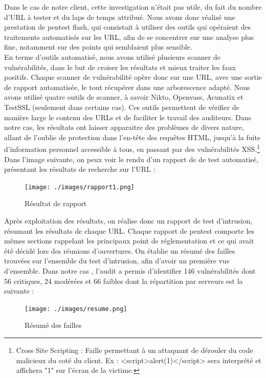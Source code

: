 \documentclass[a4paper]{memoir}
\begin{document}
Dans le cas de notre client, cette investigation n'était pas utile, du fait du nombre d'URL à tester et du laps de temps attribué. Nous avons donc réalisé une prestation de pentest flash, qui consistait à utiliser des outils qui opéraient des traitements automatisés sur les URL, afin de se concentrer sur une analyse plus fine, notamment sur des points qui semblaient plus sensible.\\
En terme d'outils automatisé, nous avons utilisé plusieurs scanner de vulnérabilités, dans le but de croiser les résultats et mieux traiter les faux positifs. Chaque scanner de vulnérabilité opère donc sur une URL, avec une sortie de rapport automatisée, le tout récupérer dans une arborescence adapté. Nous avons utilisé quatre outils de scanner, à savoir Nikto, Openvass, Acunatix et TestSSL (seulement dans certains cas). Ces outils permettent de vérifier de manière large le contenu des URLs et de faciliter le travail des auditeurs.
Dans notre cas, les résultats ont laisser apparaitre des problèmes de divers nature, allant de l'oublie de protection dans l'en-tête des requêtes HTML, jusqu'à la fuite d'information personnel accessible à tous, en passant par des vulnérabilités XSS.\footnote{Cross Site Scripting : Faille permettant à un attaquant de dérouler du code malicieux du coté du client. Ex : <script>alert(1)</script> sera interprété et affichera "1" sur l'écran de la victime.}
Dans l'image suivante, on peux voir le rendu d'un rapport de de test automatisé, présentant les résultats de recherche sur l'URL :

\begin{figure}[!ht]
    \center
    \texttt{[image: ./images/rapport1.png]}
    \caption{Résultat de rapport}
    \label{ID}
\end{figure}

Après exploitation des résultats, on réalise donc un rapport de test d'intrusion, résumant les résultats de chaque URL. Chaque rapport de pentest comporte les mêmes sections rappelant les principaux point de réglementation et ce qui avait été décidé lors des réunions d'ouvertures. 
On établie un résumé des failles trouvées sur l'ensemble du test d'intrusion, afin d'avoir un première vue d'ensemble. Dans notre cas , l’audit a permis d’identifier 146 vulnérabilités dont 56 critiques, 24 modérées et 66 faibles dont la répartition par serveurs est la suivante :

\begin{figure}[!ht]
    \center
    \texttt{[image: ./images/resume.png]}
    \caption{Résumé des failles}
    \label{ID}
\end{figure}
\end{document}
